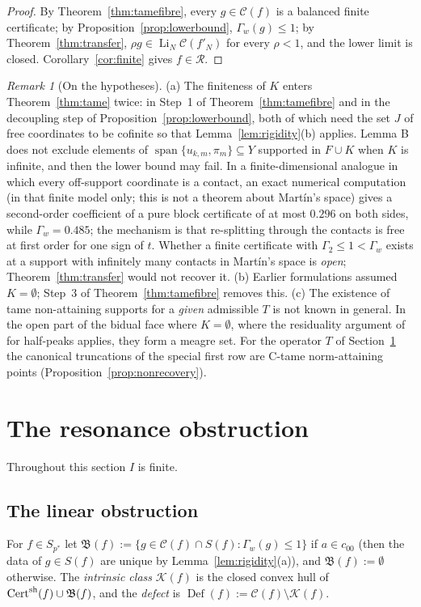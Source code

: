 \documentclass[10pt]{amsart}
\theoremstyle{definition}
\theoremstyle{remark}
\newtheorem{remark}[theorem]{Remark}
\newcommand{\spn}{\operatorname{span}}
\newcommand{\Cset}{\mathcal C}
\newcommand{\Cert}{\operatorname{Cert}}
\newcommand{\Li}{\operatorname*{Li}}
\newcommand{\Def}{\operatorname{Def}}
\newcommand{\Rec}{\mathcal R}
\begin{document}
\begin{proof}
By Theorem~\ref{thm:tamefibre}, every $g\in\Cset(f)$ is a balanced finite
certificate; by Proposition~\ref{prop:lowerbound}, $\Gamma_w(g)\le1$; by
Theorem~\ref{thm:transfer}, $\rho g\in\Li_N\Cset(f'_N)$ for every $\rho<1$,
and the lower limit is closed.  Corollary~\ref{cor:finite} gives $f\in\Rec$.
\end{proof}

\begin{remark}[On the hypotheses]\label{rem:kinks}
(a) The finiteness of $K$ enters Theorem~\ref{thm:tame} twice: in Step~1 of
Theorem~\ref{thm:tamefibre} and in the decoupling step of
Proposition~\ref{prop:lowerbound}, both of which need the set $J$ of free
coordinates to be cofinite so that Lemma~\ref{lem:rigidity}(b) applies.
Lemma B does not exclude elements of $\spn\{u_{k,m},\pi_m\}\subseteq Y$
supported in $F\cup K$ when $K$ is infinite, and then the lower bound may
fail.  In a finite-dimensional analogue in which every off-support
coordinate is a contact, an exact numerical computation (in that finite
model only; this is not a theorem about Mart\'in's space) gives a
second-order coefficient of a pure block certificate of at most $0.296$ on
both sides, while $\Gamma_w=0.485$; the mechanism is that re-splitting
through the contacts is free at first order for one sign of $t$.  Whether a finite certificate with $\Gamma_2\le1<\Gamma_w$ exists at a
support with infinitely many contacts in Mart\'in's space is \emph{open};
Theorem~\ref{thm:transfer} would not recover it.  (b) Earlier formulations
assumed $K=\emptyset$; Step~3 of Theorem~\ref{thm:tamefibre} removes this.
(c) The existence of tame non-attaining supports for a \emph{given}
admissible $T$ is not known in general.  In the open part of the bidual
face where $K=\emptyset$, where the residuality argument of
\cite[Section~3]{PrA} for half-peaks applies, they form a meagre set.
For the operator $T$ of Section~\ref{sec:resonance} the canonical
truncations of the special first row are C-tame norm-attaining points
(Proposition~\ref{prop:nonrecovery}).
\end{remark}

\section{The resonance obstruction}\label{sec:resonance}

Throughout this section $I$ is finite.

\subsection{The linear obstruction}
For $f\in S_{p^*}$ let $\mathfrak B(f):=\{g\in\Cset(f)\cap S(f):\Gamma_w(g)
\le1\}$ if $a\in c_{00}$ (then the data of $g\in S(f)$ are unique by
Lemma~\ref{lem:rigidity}(a)), and $\mathfrak B(f):=\emptyset$ otherwise.
The \emph{intrinsic class} $\mathcal K(f)$ is the closed convex hull of
$\Cert^{\rm sh}(f)\cup\mathfrak B(f)$, and the \emph{defect} is
$\Def(f):=\Cset(f)\setminus\mathcal K(f)$.
\end{document}
